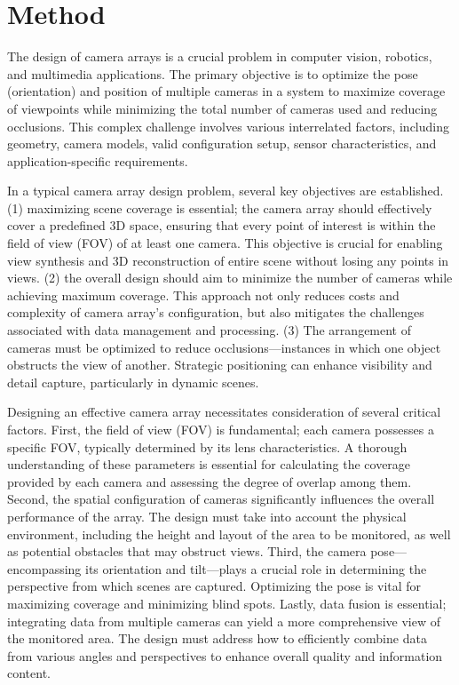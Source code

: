\section{Method}
The design of camera arrays is a crucial problem in computer vision, robotics, and multimedia applications. The primary objective is to optimize the pose (orientation) and position of multiple cameras in a system to maximize coverage of viewpoints while minimizing the total number of cameras used and reducing occlusions. This complex challenge involves various interrelated factors, including geometry, camera models, valid configuration setup, sensor characteristics, and application-specific requirements.

In a typical camera array design problem, several key objectives are established. (1) maximizing scene coverage is essential; the camera array should effectively cover a predefined 3D space, ensuring that every point of interest is within the field of view (FOV) of at least one camera. This objective is crucial for enabling view synthesis and 3D reconstruction of entire scene without losing any points in views. (2) the overall design should aim to minimize the number of cameras while achieving maximum coverage. This approach not only reduces costs and complexity of camera array's configuration, but also mitigates the challenges associated with data management and processing. (3) The arrangement of cameras must be optimized to reduce occlusions—instances in which one object obstructs the view of another. Strategic positioning can enhance visibility and detail capture, particularly in dynamic scenes.

Designing an effective camera array necessitates consideration of several critical factors.
First, the field of view (FOV) is fundamental; each camera possesses a specific FOV, typically determined by its lens characteristics. A thorough understanding of these parameters is essential for calculating the coverage provided by each camera and assessing the degree of overlap among them.
Second, the spatial configuration of cameras significantly influences the overall performance of the array. The design must take into account the physical environment, including the height and layout of the area to be monitored, as well as potential obstacles that may obstruct views.
Third, the camera pose—encompassing its orientation and tilt—plays a crucial role in determining the perspective from which scenes are captured. Optimizing the pose is vital for maximizing coverage and minimizing blind spots.
Lastly, data fusion is essential; integrating data from multiple cameras can yield a more comprehensive view of the monitored area. The design must address how to efficiently combine data from various angles and perspectives to enhance overall quality and information content.

